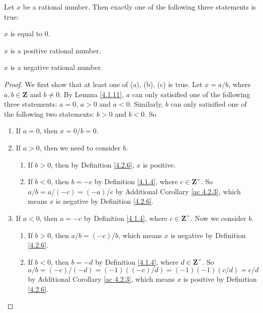 \begin{lemma}\label{4.2.7}
    Let \(x\) be a rational number.
    Then exactly one of the following three statements is true:
    \begin{enumerate*}
        \item \(x\) is equal to \(0\).
        \item \(x\) is a positive rational number.
        \item \(x\) is a negative rational number.
    \end{enumerate*}
\end{lemma}

\begin{proof}
    We first show that at least one of (a), (b), (c) is true.
    Let \(x = a / b\), where \(a, b \in \mathbf{Z}\) and \(b \neq 0\).
    By Lemma \ref{4.1.11}, \(a\) can only satisified one of the following three statements:
    \(a = 0\), \(a > 0\) and \(a < 0\).
    Similarly, \(b\) can only satisified one of the following two statements:
    \(b > 0\) and \(b < 0\).
    So
    \begin{enumerate}[label=(\Roman*)]
        \item If \(a = 0\), then \(x = 0 / b = 0\).
        \item If \(a > 0\), then we need to consider \(b\).
              \begin{enumerate}[label=(\roman*)]
                  \item If \(b > 0\), then by Definition \ref{4.2.6}, \(x\) is positive.
                  \item If \(b < 0\), then \(b = -c\) by Definition \ref{4.1.4}, where \(c \in \mathbf{Z}^+\).
                        So \(a / b = a / (-c) = (-a) / c\) by Additional Corollary \ref{ac 4.2.3}, which means \(x\) is negative by Definition \ref{4.2.6}.
              \end{enumerate}
        \item If \(a < 0\), then \(a = -c\) by Definition \ref{4.1.4}, where \(c \in \mathbf{Z}^+\).
              Now we consider \(b\).
              \begin{enumerate}[label=(\roman*)]
                  \item If \(b > 0\), then \(a / b = (-c) / b\), which means \(x\) is negative by Definition \ref{4.2.6}.
                  \item If \(b < 0\), then \(b = -d\) by Definition \ref{4.1.4}, where \(d \in \mathbf{Z}^+\).
                        So \(a / b = (-c) / (-d) = (-1)((-c) / d) = (-1)(-1)(c / d) = c / d\) by Additional Corollary \ref{ac 4.2.3}, which means \(x\) is positive by Definition \ref{4.2.6}.
              \end{enumerate}
    \end{enumerate}


\end{proof}
